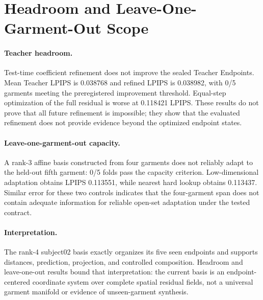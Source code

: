 \section{Headroom and Leave-One-Garment-Out Scope}
\label{sec:supp_scope}

\paragraph{Teacher headroom.}
Test-time coefficient refinement does not improve the sealed Teacher Endpoints. Mean Teacher LPIPS is 0.038768 and refined LPIPS is 0.038982, with 0/5 garments meeting the preregistered improvement threshold. Equal-step optimization of the full residual is worse at 0.118421 LPIPS. These results do not prove that all future refinement is impossible; they show that the evaluated refinement does not provide evidence beyond the optimized endpoint states.

\paragraph{Leave-one-garment-out capacity.}
A rank-3 affine basis constructed from four garments does not reliably adapt to the held-out fifth garment: 0/5 folds pass the capacity criterion. Low-dimensional adaptation obtains LPIPS 0.113551, while nearest hard lookup obtains 0.113437. Similar error for these two controls indicates that the four-garment span does not contain adequate information for reliable open-set adaptation under the tested contract.

\paragraph{Interpretation.}
The rank-4 subject02 basis exactly organizes its five seen endpoints and supports distances, prediction, projection, and controlled composition. Headroom and leave-one-out results bound that interpretation: the current basis is an endpoint-centered coordinate system over complete spatial residual fields, not a universal garment manifold or evidence of unseen-garment synthesis.

